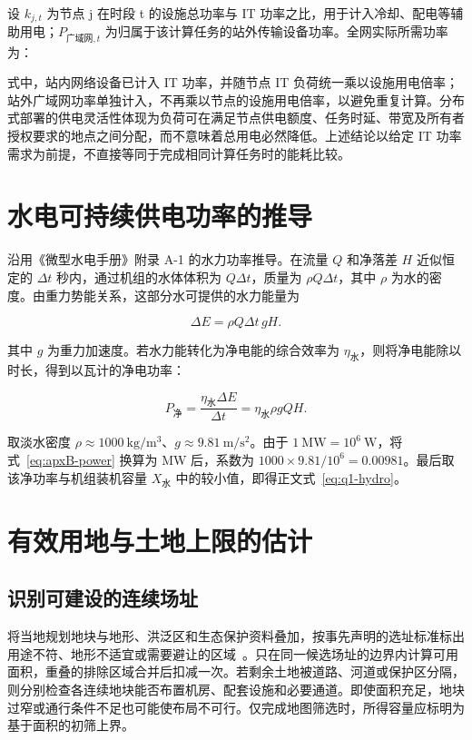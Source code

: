 设 $k_{j,t}$ 为节点 j 在时段 t 的设施总功率与 IT 功率之比，用于计入冷却、配电等辅助用电；$P_{\text{广域网},t}$ 为归属于该计算任务的站外传输设备功率。全网实际所需功率为：

式中，站内网络设备已计入 IT 功率，并随节点 IT 负荷统一乘以设施用电倍率；站外广域网功率单独计入，不再乘以节点的设施用电倍率，以避免重复计算。分布式部署的供电灵活性体现为负荷可在满足节点供电额度、任务时延、带宽及所有者授权要求的地点之间分配，而不意味着总用电必然降低。上述结论以给定 IT 功率需求为前提，不直接等同于完成相同计算任务时的能耗比较。

\section{水电可持续供电功率的推导}\label{apx:b}

沿用《微型水电手册》附录 A-1 的水力功率推导\cite{q1ref06}。在流量 $Q$ 和净落差 $H$ 近似恒定的 $\Delta t$ 秒内，通过机组的水体体积为 $Q\Delta t$，质量为 $\rho Q\Delta t$，其中 $\rho$ 为水的密度。由重力势能关系，这部分水可提供的水力能量为

\begin{equation}\label{eq:apxB-energy}
\Delta E=\rho Q\Delta t\,gH.
\end{equation}

其中 $g$ 为重力加速度。若水力能转化为净电能的综合效率为 $\eta_{\text{水}}$，则将净电能除以时长，得到以瓦计的净电功率：

\begin{equation}\label{eq:apxB-power}
P_{\text{净}}=\frac{\eta_{\text{水}}\Delta E}{\Delta t}
=\eta_{\text{水}}\rho gQH.
\end{equation}

取淡水密度 $\rho\approx1000\ \mathrm{kg/m^3}$、$g\approx9.81\ \mathrm{m/s^2}$。由于 $1\ \mathrm{MW}=10^6\ \mathrm W$，将式~\eqref{eq:apxB-power} 换算为 MW 后，系数为 $1000\times9.81/10^6=0.00981$。最后取该净功率与机组装机容量 $X_{\text{水}}$ 中的较小值，即得正文式~\eqref{eq:q1-hydro}。

\section{有效用地与土地上限的估计}\label{apx:c}

\subsection{识别可建设的连续场址}\label{apx:c1}

将当地规划地块与地形、洪泛区和生态保护资料叠加，按事先声明的选址标准标出用途不符、地形不适宜或需要避让的区域~\cite{apxrefL01}。只在同一候选场址的边界内计算可用面积，重叠的排除区域合并后扣减一次。若剩余土地被道路、河道或保护区分隔，则分别检查各连续地块能否布置机房、配套设施和必要通道。即使面积充足，地块过窄或通行条件不足也可能使布局不可行。仅完成地图筛选时，所得容量应标明为基于面积的初筛上界。

